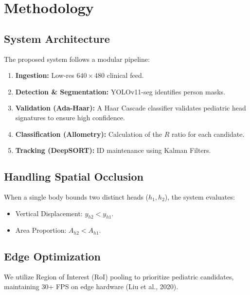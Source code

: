 \chapter{Methodology}

\section{System Architecture}
The proposed system follows a modular pipeline:
\begin{enumerate}
    \item \textbf{Ingestion:} Low-res $640 \times 480$ clinical feed.
    \item \textbf{Detection \& Segmentation:} YOLOv11-seg identifies person masks.
    \item \textbf{Validation (Ada-Haar):} A Haar Cascade classifier validates pediatric head signatures to ensure high confidence.
    \item \textbf{Classification (Allometry):} Calculation of the $R$ ratio for each candidate.
    \item \textbf{Tracking (DeepSORT):} ID maintenance using Kalman Filters.
\end{enumerate}

\section{Handling Spatial Occlusion}
When a single body bounds two distinct heads ($h_1, h_2$), the system evaluates:
\begin{itemize}
    \item Vertical Displacement: $y_{h2} < y_{h1}$.
    \item Area Proportion: $A_{h2} < A_{h1}$.
\end{itemize}

\section{Edge Optimization}
We utilize Region of Interest (RoI) pooling to prioritize pediatric candidates, maintaining 30+ FPS on edge hardware (Liu et al., 2020).
